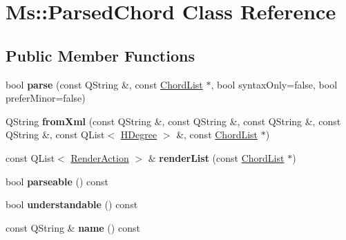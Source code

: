 \hypertarget{class_ms_1_1_parsed_chord}{}\section{Ms\+:\+:Parsed\+Chord Class Reference}
\label{class_ms_1_1_parsed_chord}
\subsection*{Public Member Functions}
\begin{DoxyCompactItemize}
\item 
\mbox{\label{class_ms_1_1_parsed_chord_ad16f0e3c9506fbe33cd6038fb198da13}} 
bool {\bfseries parse} (const Q\+String \&, const \hyperlink{class_ms_1_1_chord_list}{Chord\+List} $\ast$, bool syntax\+Only=false, bool prefer\+Minor=false)
\item 
\mbox{\label{class_ms_1_1_parsed_chord_ab3a78176f1568fc9ae039896542506d5}} 
Q\+String {\bfseries from\+Xml} (const Q\+String \&, const Q\+String \&, const Q\+String \&, const Q\+String \&, const Q\+List$<$ \hyperlink{class_ms_1_1_h_degree}{H\+Degree} $>$ \&, const \hyperlink{class_ms_1_1_chord_list}{Chord\+List} $\ast$)
\item 
\mbox{\label{class_ms_1_1_parsed_chord_a33d4e128486e9b54d13d833cb0353a58}} 
const Q\+List$<$ \hyperlink{struct_ms_1_1_render_action}{Render\+Action} $>$ \& {\bfseries render\+List} (const \hyperlink{class_ms_1_1_chord_list}{Chord\+List} $\ast$)
\item 
\mbox{\label{class_ms_1_1_parsed_chord_a3435e4826c0c9baa626a657c6990112d}} 
bool {\bfseries parseable} () const
\item 
\mbox{\label{class_ms_1_1_parsed_chord_a87c8c3447c04bd67847d5c488e31adcc}} 
bool {\bfseries understandable} () const
\item 
\mbox{\label{class_ms_1_1_parsed_chord_a3f92697450baff01a4cc21e45e592f6a}} 
const Q\+String \& {\bfseries name} () const
\item 
\mbox{\label{class_ms_1_1_parsed_chord_a1796fec8f0dd2b32cec79473e85331ba}} 

\end{DoxyCompactItemize}
